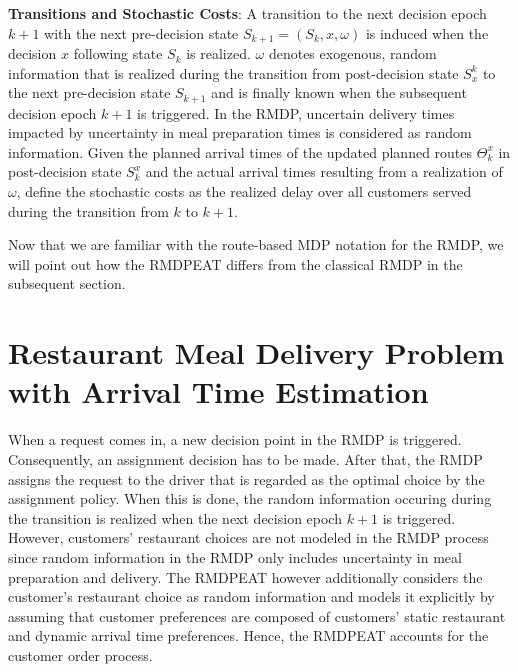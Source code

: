 \begin{description}[font=$\bullet$\scshape\bfseries]
	\item \textbf{Transitions and Stochastic Costs}: A transition to the next decision epoch $ k+1 $  with the next pre-decision state $ S_{k+1} = (S_k, x, \omega) $ is induced when the decision $ x $ following state $ S_k $ is realized. $ \omega $ denotes exogenous, random information that is realized during the transition from post-decision state $ S^{k}_x $ to the next pre-decision state $ S_{k+1} $ and is finally known when the subsequent decision epoch $ k+1 $ is triggered. In the RMDP, uncertain delivery times impacted by uncertainty in meal preparation times is considered as random information. Given the planned arrival times of the updated planned routes $ \Theta^{x}_k $ in post-decision state $ S^{x}_k $ and the actual arrival times resulting from a realization of $ \omega $, \cite{UlmerBarrett2017_TWAP} define the stochastic costs as the realized delay over all customers served during the transition from $ k $ to $ k+1 $.
\end{description}

Now that we are familiar with the route-based MDP notation for the RMDP, we will point out how the RMDPEAT differs from the classical RMDP in the subsequent section. 
\section{Restaurant Meal Delivery Problem with Arrival Time Estimation}

When a request comes in, a new decision point in the RMDP is triggered. Consequently, an assignment decision has to be made. After that, the RMDP assigns the request to the driver that is regarded as the optimal choice by the assignment policy. When this is done, the random information occuring during the transition is realized when the next decision epoch $ k+1 $ is triggered. However, customers' restaurant choices are not modeled in the RMDP process since random information in the RMDP only includes uncertainty in meal preparation and delivery. The RMDPEAT however additionally considers the customer's restaurant choice as random information and models it explicitly by assuming that customer preferences are composed of customers' static restaurant and dynamic arrival time preferences. Hence, the RMDPEAT accounts for the customer order process. 

